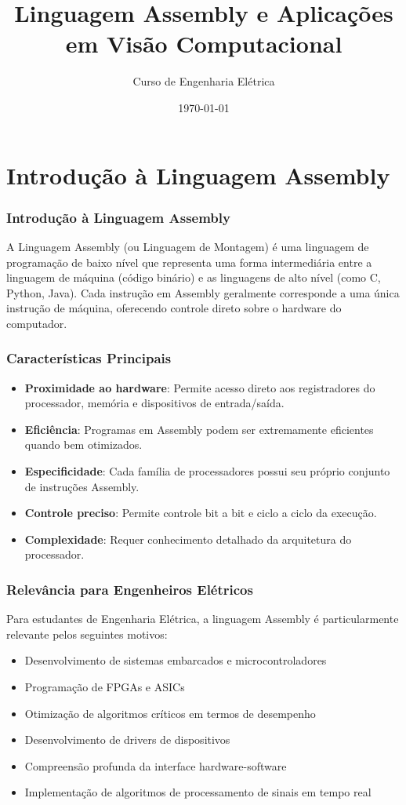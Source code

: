\documentclass[11pt]{beamer}
\title{Linguagem Assembly e Aplicações em Visão Computacional}
\author{Curso de Engenharia Elétrica}
\institute[UNESP]{Departamento de Engenharia Elétrica}
\date{\today}
\begin{document}
\frame{\titlepage}

\section{Introdução à Linguagem Assembly}

\begin{frame}
\frametitle{Introdução à Linguagem Assembly}

A Linguagem Assembly (ou Linguagem de Montagem) é uma linguagem de programação de baixo nível que representa uma forma intermediária entre a linguagem de máquina (código binário) e as linguagens de alto nível (como C, Python, Java). Cada instrução em Assembly geralmente corresponde a uma única instrução de máquina, oferecendo controle direto sobre o hardware do computador.

\end{frame}

\begin{frame}
\frametitle{Características Principais}

\begin{itemize}
    \item \textbf{Proximidade ao hardware}: Permite acesso direto aos registradores do processador, memória e dispositivos de entrada/saída.
    \item \textbf{Eficiência}: Programas em Assembly podem ser extremamente eficientes quando bem otimizados.
    \item \textbf{Especificidade}: Cada família de processadores possui seu próprio conjunto de instruções Assembly.
    \item \textbf{Controle preciso}: Permite controle bit a bit e ciclo a ciclo da execução.
    \item \textbf{Complexidade}: Requer conhecimento detalhado da arquitetura do processador.
\end{itemize}

\end{frame}

\begin{frame}
\frametitle{Relevância para Engenheiros Elétricos}

Para estudantes de Engenharia Elétrica, a linguagem Assembly é particularmente relevante pelos seguintes motivos:

\begin{itemize}
    \item Desenvolvimento de sistemas embarcados e microcontroladores
    \item Programação de FPGAs e ASICs
    \item Otimização de algoritmos críticos em termos de desempenho
    \item Desenvolvimento de drivers de dispositivos
    \item Compreensão profunda da interface hardware-software
    \item Implementação de algoritmos de processamento de sinais em tempo real
\end{itemize}

\end{frame}
\end{document}
